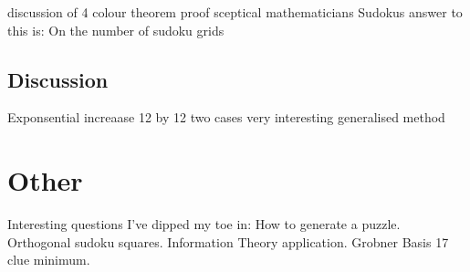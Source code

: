 \documentclass[a4paper,11pt]{report}
\newcounter{col}
\begin{document}
discussion of 4 colour theorem proof
sceptical mathematicians
Sudokus answer to this is: On the number of sudoku grids

\section{Discussion}
Exponsential increaase
12 by 12 two cases very interesting
generalised method

\chapter{Other}
Interesting questions I've dipped my toe in:
How to generate a puzzle.
Orthogonal sudoku squares.
Information Theory application.
Grobner Basis
17 clue minimum.


\end{document}
